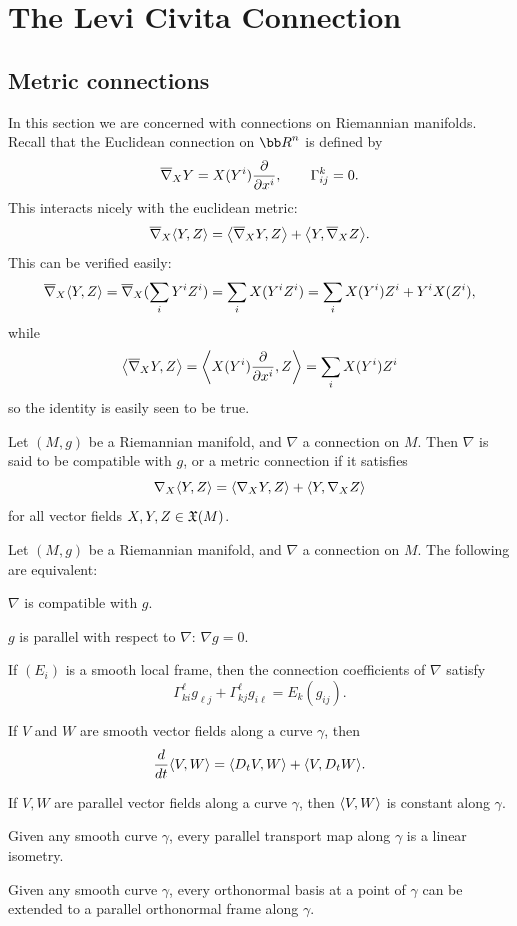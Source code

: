 \section{The Levi Civita Connection}

\subsection{Metric connections}

In this section we are concerned with connections on Riemannian manifolds.
Recall that the Euclidean connection on $\bR^n$ is defined by
$$ \overline\nabla_XY = X(Y^i){{\partial }\over{\partial x^i}},\qquad \Gamma^k_{ij} = 0 . $$
This interacts nicely with the euclidean metric:
$$ \overline\nabla_X\mathopen{}\mathclose{\left<Y,Z\right>} = \mathopen{}\mathclose{\left<\overline\nabla_XY,Z\right>} + \mathopen{}\mathclose{\left<Y,\overline\nabla_XZ\right>} . $$
This can be verified easily:
$$ \overline\nabla_X\mathopen{}\mathclose{\left<Y,Z\right>} = \overline\nabla_X(\sum_i Y^iZ^i) = \sum_i X(Y^iZ^i) = \sum_i X(Y^i)Z^i + Y^iX(Z^i) , $$
while
$$ \mathopen{}\mathclose{\left<\overline\nabla_XY,Z\right>} = \mathopen{}\mathclose{\left<X(Y^i){{\partial }\over{\partial x^i}},Z\right>} = \sum_i X(Y^i)Z^i $$
so the identity is easily seen to be true.

\bdefn

    Let $(M,g)$ be a Riemannian manifold, and $\nabla$ a connection on $M$.
    Then $\nabla$ is said to be {\emphcolor compatible} with $g$, or a {\emphcolor metric connection} if it satisfies
    $$ \nabla_X\mathopen{}\mathclose{\left<Y,Z\right>} = \mathopen{}\mathclose{\left<\nabla_XY,Z\right>} + \mathopen{}\mathclose{\left<Y,\nabla_XZ\right>} $$
    for all vector fields $X,Y,Z\in{\frak X}(M)$.

\edefn

\bprop

    Let $(M,g)$ be a Riemannian manifold, and $\nabla$ a connection on $M$.
    The following are equivalent:
    \benum
        \item $\nabla$ is compatible with $g$.
        \item $g$ is parallel with respect to $\nabla$: $\nabla g=0$.
        \item If $(E_i)$ is a smooth local frame, then the connection coefficients of $\nabla$ satisfy
        $$ \Gamma^\ell_{ki}g_{\ell j} + \Gamma^\ell_{kj}g_{i\ell} = E_k(g_{ij}) . $$
        \item If $V$ and $W$ are smooth vector fields along a curve $\gamma$, then
        $$ {{d}\over{dt}}\mathopen{}\mathclose{\left<V,W\right>} = \mathopen{}\mathclose{\left<D_tV,W\right>} + \mathopen{}\mathclose{\left<V,D_tW\right>} . $$
        \item If $V,W$ are parallel vector fields along a curve $\gamma$, then $\mathopen{}\mathclose{\left<V,W\right>}$ is constant along $\gamma$.
        \item Given any smooth curve $\gamma$, every parallel transport map along $\gamma$ is a linear isometry.
        \item Given any smooth curve $\gamma$, every orthonormal basis at a point of $\gamma$ can be extended to a parallel
        orthonormal frame along $\gamma$.
    \eenum

